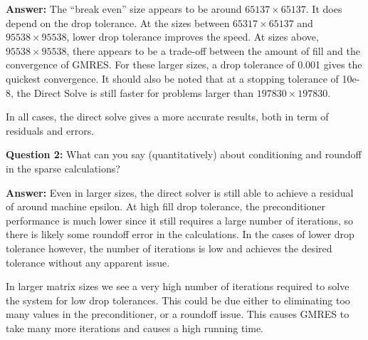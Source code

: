 \documentclass[oneside,final]{amsart}  %
\begin{document}
\textbf{Answer: }The ``break even'' size appears to be around $65137\times65137$.
It does depend on the drop tolerance.
At the sizes between $65317\times65137$ and $95538\times95538$, lower drop tolerance improves the speed.
At sizes above, $95538\times95538$, there appears to be a trade-off between the amount of fill and the convergence of GMRES.
For these larger sizes, a drop tolerance of 0.001 gives the quickest convergence.
It should also be noted that at a stopping tolerance of 10e-8, the Direct Solve is still faster for problems larger than $197830\times197830$.

In all cases, the direct solve gives a more accurate results, both in term of residuals and errors.

\textbf{Question 2: }What can you say (quantitatively) about conditioning and roundoff in the sparse calculations?

\textbf{Answer: }Even in larger sizes, the direct solver is still able to achieve a residual of around machine epsilon.
At high fill drop tolerance, the preconditioner performance is much lower since it still requires a large number of iterations, so there is likely some
roundoff error in the calculations.
In the cases of lower drop tolerance however, the number of iterations is low and achieves the desired tolerance without any apparent issue.

In larger matrix sizes we see a very high number of iterations required to solve the system for low drop tolerances.
This could be due either to eliminating too many values in the preconditioner, or a roundoff issue.
This causes GMRES to take many more iterations and causes a high running time.
\end{document}
